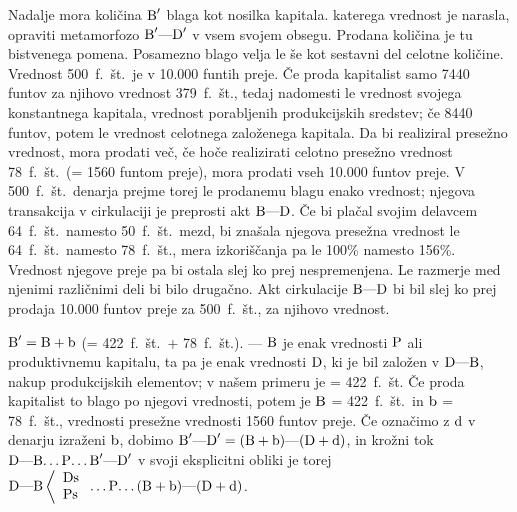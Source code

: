 \documentclass[kapital_02.tex]{subfiles}
\begin{document}
Nadalje mora količina \( \textrm{B}' \) blaga kot nosilka kapitala. katerega vrednost je narasla, opraviti metamorfozo \( \textrm{B}'\textrm{---}\textrm{D}' \) v vsem svojem obsegu. Prodana količina je tu bistvenega pomena. Posamezno blago velja le še kot sestavni del celotne količine. Vrednost 500~f.~št.\ je v 10.000 funtih preje. Če proda kapitalist samo 7440 funtov za njihovo vrednost 379~f.~št., tedaj nadomesti le vrednost svojega konstantnega kapitala, vrednost porabljenih produkcijskih sredstev; če 8440 funtov, potem le vrednost celotnega založenega kapitala. Da bi realiziral presežno vrednost, mora prodati več, če hoče realizirati celotno presežno vrednost 78~f.~št.\ (= 1560 funtom preje), mora prodati vseh 10.000 funtov preje. V 500~f.~št.\ denarja prejme torej le prodanemu blagu enako vrednost; njegova transakcija v cirkulaciji je preprosti akt \( \textrm{B}\textrm{---}\textrm{D} \). Če bi plačal svojim delavcem 64~f.~št.\ namesto 50~f.~št.\ mezd, bi znašala njegova presežna vrednost le 64~f.~št.\ namesto 78~f.~št., mera izkoriščanja pa le 100\% namesto 156\%. Vrednost njegove preje pa bi ostala slej ko prej nespremenjena. Le razmerje med njenimi različnimi deli bi bilo drugačno. Akt cirkulacije \( \textrm{B}\textrm{---}\textrm{D} \) bi bil slej ko prej prodaja 10.000 funtov preje za 500~f.~št., za njihovo vrednost.

\( \textrm{B}' = \textrm{B} + \textrm{b} \) (= 422~f.~št.\ + 78~f.~št.). --- \( \textrm{B} \) je enak vrednosti \( \textrm{P} \) ali produktivnemu kapitalu, ta pa je enak vrednosti \( \textrm{D} \), ki je bil založen v \( \textrm{D}\textrm{---}\textrm{B} \), nakup produkcijskih elementov; v našem primeru je = 422~f.~št. Če proda kapitalist to blago po njegovi vrednosti, potem je \( \textrm{B} \) = 422~f.~št.\ in \( \textrm{b} \) = 78~f.~št., vrednosti presežne vrednosti 1560 funtov preje. Če označimo z \( \textrm{d} \) v denarju izraženi \( \textrm{b} \), dobimo \( \textrm{B}'\textrm{---}\textrm{D}' = (\textrm{B} + \textrm{b})\textrm{---}(\textrm{D}+\textrm{d}) \), in krožni tok \( \textrm{D}\textrm{---}\textrm{B}\textrm{\dots}\textrm{P}\textrm{\dots}\textrm{B}'\textrm{---}\textrm{D}' \) v svoji eksplicitni obliki je torej \( 
    \textrm{D}\textrm{---}\textrm{B}\left< 
    \begin{array}{l}
        \textrm{Ds}\\
        \textrm{Ps}\\
    \end{array}
    \right.\textrm{\dots}\textrm{P}\textrm{\dots}(\textrm{B} + \textrm{b})\textrm{---}(\textrm{D} + \textrm{d})
\).
\end{document}
